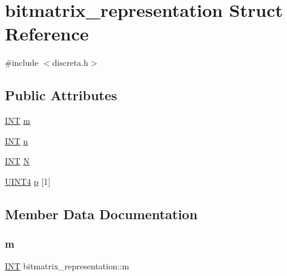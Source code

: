 \hypertarget{structbitmatrix__representation}{}\section{bitmatrix\+\_\+representation Struct Reference}
\label{structbitmatrix__representation}


{\ttfamily \#include $<$discreta.\+h$>$}

\subsection*{Public Attributes}
\begin{DoxyCompactItemize}
\item 
\mbox{\hyperlink{galois_8h_a09fddde158a3a20bd2dcadb609de11dc}{I\+NT}} \mbox{\hyperlink{structbitmatrix__representation_aaaccdb0ef08c19f3899cbb6c0b03d303}{m}}
\item 
\mbox{\hyperlink{galois_8h_a09fddde158a3a20bd2dcadb609de11dc}{I\+NT}} \mbox{\hyperlink{structbitmatrix__representation_a0857d63f15f0ad369bca4748b116cdee}{n}}
\item 
\mbox{\hyperlink{galois_8h_a09fddde158a3a20bd2dcadb609de11dc}{I\+NT}} \mbox{\hyperlink{structbitmatrix__representation_ad4d433383609dd2cde0de2a1366f507f}{N}}
\item 
\mbox{\hyperlink{galois_8h_ac94af6544c710549c9fca744fd510395}{U\+I\+N\+T4}} \mbox{\hyperlink{structbitmatrix__representation_a1b3ea449937515a80e5237e8f5f29787}{p}} \mbox{[}1\mbox{]}
\end{DoxyCompactItemize}


\subsection{Member Data Documentation}
\mbox{\label{structbitmatrix__representation_aaaccdb0ef08c19f3899cbb6c0b03d303}} 
\subsubsection{\texorpdfstring{m}{m}}
{\footnotesize\ttfamily \mbox{\hyperlink{galois_8h_a09fddde158a3a20bd2dcadb609de11dc}{I\+NT}} bitmatrix\+\_\+representation\+::m}

\mbox{\label{structbitmatrix__representation_a0857d63f15f0ad369bca4748b116cdee}} 
